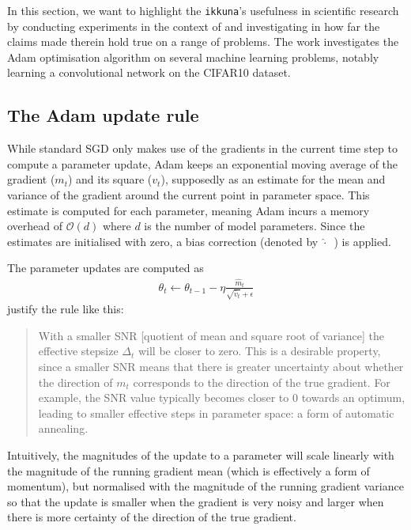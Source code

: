 In this section, we want to highlight the \texttt{ikkuna}'s usefulness in
scientific research by conducting experiments in the context of
\citep{kingma2014adam} and investigating in how far the claims made therein hold
true on a range of problems. The work investigates the Adam optimisation
algorithm on several machine learning problems, notably learning a convolutional
network on the CIFAR10 dataset.

\subsection{The Adam update rule}%
\label{sub:the_adam_update_rule}

While standard SGD only makes use of the gradients in the current time step to
compute a parameter update, Adam keeps an exponential moving average of the
gradient ($m_t$) and its square ($v_t$), supposedly as an estimate for the mean
and variance of the gradient around the current point in parameter space. This
estimate is computed for each parameter, meaning Adam incurs a memory overhead
of $\mathcal{O}(d)$ where $d$ is the number of model parameters. Since the
estimates are initialised with zero, a bias correction (denoted by
$\widehat{\cdot}$~) is applied.

The parameter updates are computed as
\begin{align}
    \theta_t \leftarrow \theta_{t-1}  - \eta \frac{\widehat{m}_t}{\sqrt{\widehat{v}_t} +
    \epsilon}
    \label{eq:adam}
\end{align}
\citeauthor{kingma2014adam} justify the rule like this:
\begin{quote}
    With a smaller SNR [quotient of mean and square root of variance] the
    effective stepsize $\Delta_t$ will be closer to zero. This is a desirable
    property, since a smaller SNR means that there is greater uncertainty about
    whether the direction of $m_t$ corresponds to the direction of the true
    gradient. For example, the SNR value typically becomes closer to $0$ towards
    an optimum, leading to smaller effective steps in parameter space: a form of
    automatic annealing.
\end{quote}

Intuitively, the magnitudes of the update to a parameter will scale linearly
with the magnitude of the running gradient mean (which is effectively a form of
momentum), but normalised with the magnitude of the running gradient variance so
that the update is smaller when the gradient is very noisy and larger when there
is more certainty of the direction of the true gradient.

